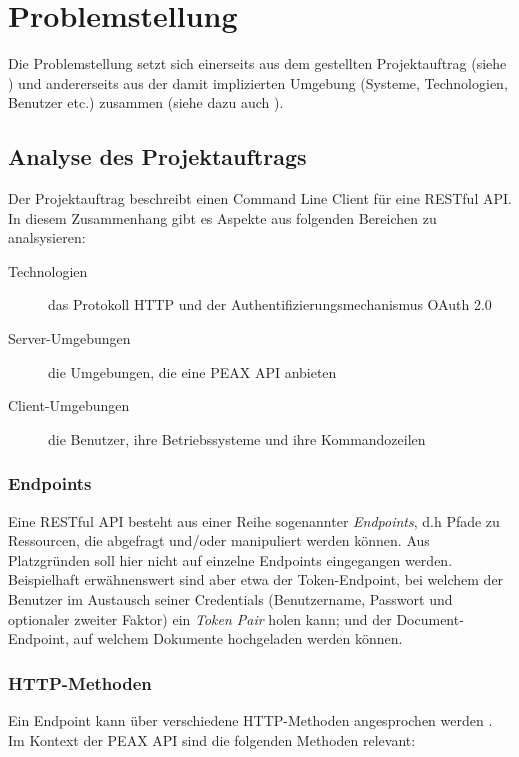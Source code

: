 \section{Problemstellung}

Die Problemstellung setzt sich einerseits aus dem gestellten Projektauftrag (siehe ) und andererseits aus der damit implizierten Umgebung (Systeme, Technologien, Benutzer etc.) zusammen (siehe dazu auch ).

\subsection{Analyse des Projektauftrags}

Der Projektauftrag beschreibt einen Command Line Client für eine RESTful API. In diesem Zusammenhang gibt es Aspekte aus folgenden Bereichen zu analsysieren:

\begin{description}
    \item[Technologien] das Protokoll HTTP und der Authentifizierungsmechanismus OAuth 2.0
    \item[Server-Umgebungen] die Umgebungen, die eine PEAX API anbieten
    \item[Client-Umgebungen] die Benutzer, ihre Betriebssysteme und ihre Kommandozeilen
\end{description}

\subsubsection{Endpoints}

Eine RESTful API besteht aus einer Reihe sogenannter \textit{Endpoints}, d.h Pfade zu Ressourcen, die abgefragt und/oder manipuliert werden können. Aus Platzgründen soll hier nicht auf einzelne Endpoints eingegangen werden. Beispielhaft erwähnenswert sind aber etwa der Token-Endpoint, bei welchem der Benutzer im Austausch seiner Credentials (Benutzername, Passwort und optionaler zweiter Faktor) ein \textit{Token Pair} holen kann; und der Document-Endpoint, auf welchem Dokumente hochgeladen werden können.

\subsubsection{HTTP-Methoden}

Ein Endpoint kann über verschiedene HTTP-Methoden angesprochen werden \cite[Abschnitt 4.3]{RFC7231}. Im Kontext der PEAX API sind die folgenden Methoden relevant:

